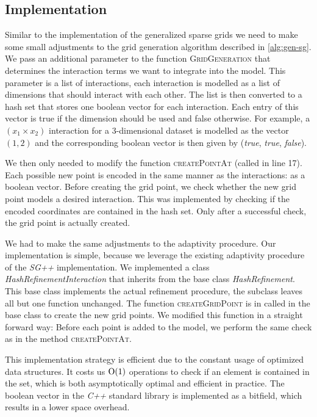 \subsection{Implementation}
Similar to the implementation of the generalized sparse grids we need to
make some small adjustments to the grid generation algorithm described in \cref{alg:gen-sg}.
We pass an additional parameter to the function \textsc{GridGeneration} that determines the interaction terms we want to integrate into the model.
This parameter is a list of interactions, each interaction is modelled as a list of dimensions that should interact with each other.
The list is then converted to a hash set that stores one boolean vector for each interaction.
Each entry of this vector is true if the dimension should be used and false otherwise.
For example, a \((x_1 \times x_2)\) interaction for a 3-dimensional dataset is
modelled as the vector \((1, 2)\) and the corresponding boolean vector is then given by (\emph{true}, \emph{true}, \emph{false}).

We then only needed to modify the function \textsc{createPointAt} (called in line 17).
Each possible new point is encoded in the same manner as the interactions: as a boolean vector.
Before creating the grid point, we check whether the new grid point models a desired interaction.
This was implemented by checking if the encoded coordinates are contained in the hash set.
Only after a successful check, the grid point is actually created.

We had to make the same adjustments to the adaptivity procedure.
Our implementation is simple, because we leverage the existing adaptivity
procedure of the \emph{SG++} implementation.
We implemented a class \emph{HashRefinementInteraction} that inherits from the base
class \emph{HashRefinement}.
This base class implements the actual refinement procedure, the subclass leaves all but one function unchanged.
The function \textsc{createGridPoint} is in called in the base class to create the new grid points.
We modified this function in a straight forward way:
Before each point is added to the model, we perform the same check as in the method \textsc{createPointAt}.

This implementation strategy is efficient due to the constant usage of optimized data structures.
It costs us \(\operatorname{O}(1)\) operations to check if an element is contained in the set, which is both asymptotically optimal and efficient in practice.
The boolean vector in the \emph{C++} standard library is implemented as a bitfield, which results in a lower space overhead.

